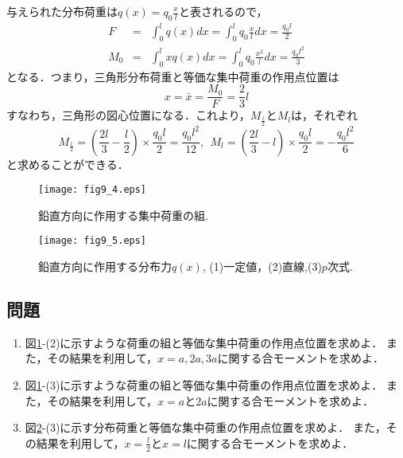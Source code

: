 \documentclass[10pt,a4j]{jbook}
\begin{document}
\begin{enumerate}
与えられた分布荷重は$q(x)=q_0\frac{x}{l}$と表されるので，
\begin{eqnarray}
	F&= & \int _0^l q(x)dx = \int_0^l q_0 \frac{x}{l}dx=\frac{q_0l}{2}
	\label{eqn:}
	\\
	M_0&= & \int _0^l xq(x)dx = \int_0^l q_0 \frac{x^2}{l}dx=\frac{q_0l^2}{3}
	\label{eqn:}
\end{eqnarray}
となる．つまり，三角形分布荷重と等価な集中荷重の作用点位置は
\begin{equation}
	x=\bar x = \frac{M_0}{F}=\frac{2}{3}l
	\label{eqn:xbar_tri}
\end{equation}
すなわち，三角形の図心位置になる．これより，$M_{\frac{l}{2}}$と$M_l$は，それぞれ
\begin{equation}
	M_{\frac{l}{2}}=\left(\frac{2l}{3}-\frac{l}{2}\right) \times \frac{q_0l}{2} =\frac{q_0l^2}{12}, \ \ 
	M_l = \left(\frac{2l}{3}-l \right) \times \frac{q_0l}{2} =-\frac{q_0l^2}{6}
	\label{eqn:}
\end{equation}
と求めることができる．
\end{enumerate}
\begin{figure}[h]
	\begin{center}
	\texttt{[image: fig9\_4.eps]} 
	\end{center}
	\caption{
		鉛直方向に作用する集中荷重の組.
	} 
	\label{fig:fig9_4}
\end{figure}
\begin{figure}[h]
	\begin{center}
	\texttt{[image: fig9\_5.eps]} 
	\end{center}
	\caption{
		鉛直方向に作用する分布力$q(x)$, (1)一定値，(2)直線,(3)$p$次式.
	} 
	\label{fig:fig9_5}
\end{figure}
\subsection{問題}
\begin{enumerate}
\item
	図\ref{fig:fig9_4}-(2)に示すような荷重の組と等価な集中荷重の作用点位置を求めよ．
	また，その結果を利用して，$x=a,2a,3a$に関する合モーメントを求めよ．
\item
	図\ref{fig:fig9_4}-(3)に示すような荷重の組と等価な集中荷重の作用点位置を求めよ．
	また，その結果を利用して，$x=a$と$2a$に関する合モーメントを求めよ．
\item
	図\ref{fig:fig9_5}-(3)に示す分布荷重と等価な集中荷重の作用点位置を求めよ．
		また，その結果を利用して，$x=\frac{l}{2}$と$x=l$に関する合モーメントを求めよ．
\end{enumerate}
\end{document}
